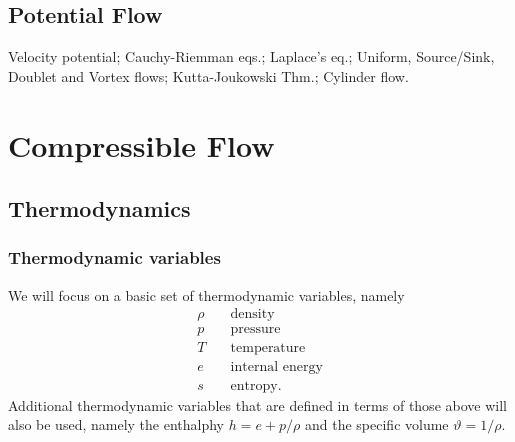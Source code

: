 \documentclass[oneside,a4paper,11pt]{report}
\begin{document}
%
\chapter{Potential Flow}
%
Velocity potential; Cauchy-Riemman eqs.; Laplace's eq.; Uniform, Source/Sink, Doublet and Vortex flows; Kutta-Joukowski Thm.; Cylinder flow.

\part{Compressible Flow}                                                      %

%
\chapter{Thermodynamics}
%
\section{Thermodynamic variables}
We will focus on a basic set of thermodynamic variables, namely 
\begin{align}
    \rho & \quad \text{density} \nonumber \\
    p & \quad \text{pressure} \nonumber \\
    T & \quad \text{temperature} \nonumber \\
    e & \quad \text{internal energy} \nonumber \\
    s & \quad \text{entropy}. \nonumber
\end{align}
Additional thermodynamic variables that are defined in terms of those above will also be used, namely the enthalphy $h = e + p/\rho$ and the specific volume $\vartheta = 1/\rho$.
\end{document}
